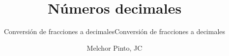 \documentclass{guia}
\title{Números decimales}
\subtitle{Conversión de fracciones a decimales}
\subtitle{Conversión de fracciones a decimales}
\author{Melchor Pinto, JC}
\begin{document}
%
\begin{questions}
\questionboxed{}
\end{questions}
\end{document}

